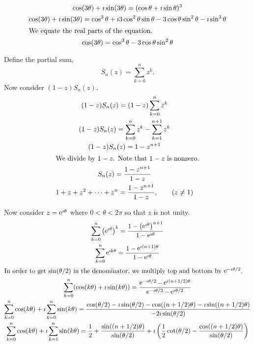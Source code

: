 {%
\begin{Solution}
  \label{solution cos 3t = cos3 t - 3 cos t sin2 t}
  \begin{gather*}
    \cos(3 \theta) + \imath \sin(3 \theta) = (\cos \theta + \imath \sin \theta)^3 
    \\
    \cos(3 \theta) + \imath \sin(3 \theta) = \cos^3 \theta + \imath 3 \cos^2 \theta \sin \theta
    - 3 \cos \theta \sin^2 \theta - \imath \sin^3 \theta 
    \\
    \intertext{We equate the real parts of the equation.}
    \cos(3 \theta) = \cos^3 \theta - 3 \cos \theta \sin^2 \theta 
  \end{gather*}
\end{Solution}








\begin{Solution}
  \label{solution geometric trig identity}
  Define the partial sum,
  \[
  S_n(z) = \sum_{k=0}^n z^k.
  \]
  Now consider $(1 - z) S_n(z)$.
  \begin{gather*}
    (1 - z) S_n(z) = (1 - z) \sum_{k=0}^n z^k 
    \\
    (1 - z) S_n(z) = \sum_{k=0}^n z^k - \sum_{k=1}^{n+1} z^k 
    \\
    (1 - z) S_n(z) = 1 - z^{n+1} 
    \\
    \intertext{We divide by $1 - z$.  Note that $1 - z$ is nonzero.}
    S_n(z) = \frac{1 - z^{n+1} }{ 1 - z } 
    \\
    1 + z + z^2 + \cdots + z^n = \frac{1 - z^{n+1}}{1 - z}, \qquad (z \neq 1)
  \end{gather*}

  Now consider $z = \mathop{\mathrm{e}}\nolimits^{\imath \theta}$ where $0 < \theta < 2 \pi$ so that $z$ is not unity.
  \begin{gather*}
    \sum_{k = 0}^n \left( \mathop{\mathrm{e}}\nolimits^{\imath \theta} \right)^k = \frac{1 - \left( \mathop{\mathrm{e}}\nolimits^{\imath \theta} \right)^{n+1} }{1 - \mathop{\mathrm{e}}\nolimits^{\imath \theta}}
    \\
    \sum_{k = 0}^n \mathop{\mathrm{e}}\nolimits^{\imath k \theta} = \frac{1 - \mathop{\mathrm{e}}\nolimits^{\imath (n+1) \theta} }{1 - \mathop{\mathrm{e}}\nolimits^{\imath \theta}} 
    \\
    \intertext{In order to get $\sin(\theta/2)$ in the denominator, we 
      multiply top and bottom by $\mathop{\mathrm{e}}\nolimits^{-\imath \theta / 2}$.}
    \sum_{k = 0}^n (\cos(k \theta) + \imath \sin(k \theta) ) =
    \frac{\mathop{\mathrm{e}}\nolimits^{- \imath \theta / 2} - \mathop{\mathrm{e}}\nolimits^{\imath (n+1/2) \theta} }{\mathop{\mathrm{e}}\nolimits^{-\imath \theta / 2} - \mathop{\mathrm{e}}\nolimits^{\imath \theta / 2}} 
    \\
    \sum_{k = 0}^n \cos(k \theta) + \imath \sum_{k = 0}^n \sin(k \theta) =
    \frac{ \cos(\theta/2) - \imath \sin(\theta/2)
      - \cos((n+1/2) \theta) - \imath \sin((n+1/2) \theta) }{ - 2 \imath \sin(\theta/2) } 
    \\
    \sum_{k = 0}^n \cos(k \theta) + \imath \sum_{k = 1}^n \sin(k \theta) =
    \frac{1}{2} + \frac{ \sin((n+1/2) \theta) }{ \sin(\theta/2) }
    + \imath \left( \frac{1}{2} \cot(\theta/2)
      - \frac{ \cos((n+1/2) \theta) }{ \sin(\theta/2) } \right)
  \end{gather*}



\end{Solution}}
